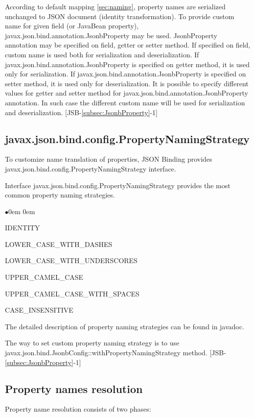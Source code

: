 According to default mapping \ref{sec:naming}, property names are serialized unchanged to JSON document (identity transformation). To provide custom name for given field (or JavaBean property), javax.json.bind.annotation.JsonbProperty may be used. JsonbProperty annotation may be specified on field, getter or setter method. If specified on field, custom name is used both for serialization and deserialization. If javax.json.bind.annotation.JsonbProperty is specified on getter method, it is used only for serialization. If javax.json.bind.annotation.JsonbProperty is specified on setter method, it is used only for deserialization. It is possible to specify different values for getter and setter method for javax.json.bind.annotation.JsonbProperty annotation. In such case the different custom name will be used for serialization and deserialization. [JSB-\ref{subsec:JsonbProperty}-1]

\subsection{javax.json.bind.config.PropertyNamingStrategy}
\label{subsec:PropertyNamingStrategy}

To customize name translation of properties, JSON Binding provides javax.json.bind.config.PropertyNamingStrategy interface.

Interface javax.json.bind.config.PropertyNamingStrategy provides the most common property naming strategies.

\begin{list}{$\bullet$}{\parsep 0em  0em}
\item IDENTITY
\item LOWER\_CASE\_WITH\_DASHES
\item LOWER\_CASE\_WITH\_UNDERSCORES
\item UPPER\_CAMEL\_CASE
\item UPPER\_CAMEL\_CASE\_WITH\_SPACES
\item CASE\_INSENSITIVE
\end{list}

The detailed description of property naming strategies can be found in javadoc.

The way to set custom property naming strategy is to use javax.json.bind.JsonbConfig::withPropertyNamingStrategy method. [JSB-\ref{subsec:JsonbProperty}-1]

\subsection{Property names resolution}
\label{sec:property_names_resolution}
Property name resolution consists of two phases:

